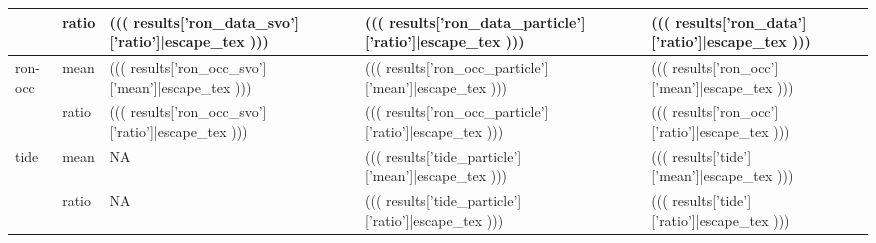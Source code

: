 \begin{table}[]
\begin{tabular}{lllll}
                           & \multicolumn{1}{l|}{ratio} & \multicolumn{1}{l|}{((( results['ron_data_svo']['ratio']|escape_tex )))}   & \multicolumn{1}{l|}{((( results['ron_data_particle']['ratio']|escape_tex )))}   & \multicolumn{1}{l|}{((( results['ron_data']['ratio']|escape_tex )))}   \\ \hline
\multirow{2}{*}{ron-occ}   & \multicolumn{1}{l|}{mean}  & \multicolumn{1}{l|}{((( results['ron_occ_svo']['mean']|escape_tex )))}     & \multicolumn{1}{l|}{((( results['ron_occ_particle']['mean']|escape_tex )))}     & \multicolumn{1}{l|}{((( results['ron_occ']['mean']|escape_tex )))}     \\ \cline{2-5}
                           & \multicolumn{1}{l|}{ratio} & \multicolumn{1}{l|}{((( results['ron_occ_svo']['ratio']|escape_tex )))}    & \multicolumn{1}{l|}{((( results['ron_occ_particle']['ratio']|escape_tex )))}    & \multicolumn{1}{l|}{((( results['ron_occ']['ratio']|escape_tex )))}    \\ \hline
\multirow{2}{*}{tide}      & \multicolumn{1}{l|}{mean}  & \multicolumn{1}{l|}{N\/A}                                                  & \multicolumn{1}{l|}{((( results['tide_particle']['mean']|escape_tex )))}        & \multicolumn{1}{l|}{((( results['tide']['mean']|escape_tex )))}        \\ \cline{2-5}
                           & \multicolumn{1}{l|}{ratio} & \multicolumn{1}{l|}{N\/A}                                                  & \multicolumn{1}{l|}{((( results['tide_particle']['ratio']|escape_tex )))}       & \multicolumn{1}{l|}{((( results['tide']['ratio']|escape_tex )))}       \\ \hline
\end{tabular}
\end{table}
